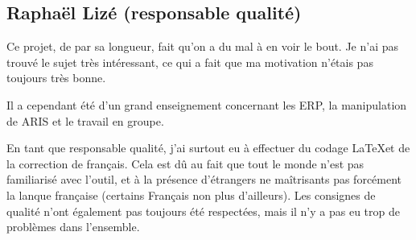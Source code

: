 \subsection{Raphaël Lizé (responsable qualité)}

Ce projet, de par sa longueur, fait qu'on a du mal à en voir
le bout. Je n'ai pas trouvé le sujet très intéressant, ce qui
a fait que ma motivation n'étais pas toujours très bonne.

Il a cependant été d'un grand enseignement concernant les ERP,
la manipulation de ARIS et le travail en groupe.

En tant que responsable qualité, j'ai surtout eu à effectuer
du codage \LaTeX et de la correction de français. Cela est dû
au fait que tout le monde n'est pas familiarisé avec l'outil,
et à la présence d'étrangers ne maîtrisants pas forcément
la lanque française (certains Français non plus d'ailleurs).
Les consignes de qualité n'ont également pas toujours été respectées,
mais il n'y a pas eu trop de problèmes dans l'ensemble.
